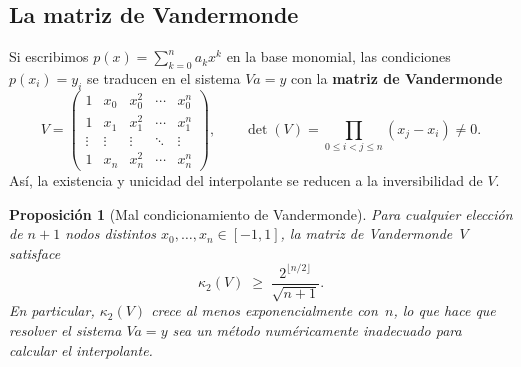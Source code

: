 \documentclass[a4paper,11pt]{report}
\newtheorem{proposition}[theorem]{Proposición}
\begin{document}
\subsection{La matriz de Vandermonde}\label{subsec:vandermonde}

Si escribimos $p(x) = \sum_{k=0}^n a_k x^k$ en la base monomial, las condiciones $p(x_i)=y_i$ se traducen en el sistema $Va = y$ con la \textbf{matriz de Vandermonde}
\[
V = \begin{pmatrix}
1 & x_0 & x_0^2 & \cdots & x_0^n \\
1 & x_1 & x_1^2 & \cdots & x_1^n \\
\vdots & \vdots & \vdots & \ddots & \vdots \\
1 & x_n & x_n^2 & \cdots & x_n^n
\end{pmatrix}, \qquad
\det(V) = \prod_{0\le i<j\le n}(x_j - x_i) \neq 0.
\]
Así, la existencia y unicidad del interpolante se reducen a la inversibilidad de $V$.

\begin{proposition}[Mal condicionamiento de Vandermonde]\label{prop:vandermonde_cond}
Para cualquier elección de $n+1$ nodos distintos $x_0,\ldots,x_n\in[-1,1]$, la matriz de Vandermonde~$V$ satisface
\[
\kappa_2(V) \;\ge\; \frac{2^{\lfloor n/2\rfloor}}{\sqrt{n+1}}.
\]
En particular, $\kappa_2(V)$ crece al menos exponencialmente con~$n$, lo que hace que resolver el sistema $Va=y$ sea un método numéricamente \emph{inadecuado} para calcular el interpolante.
\end{proposition}
\end{document}
